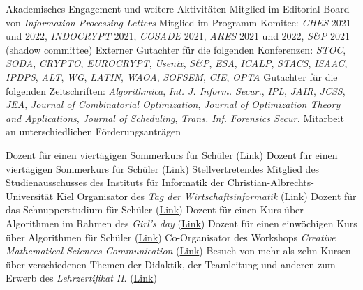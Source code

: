 \begin{rubric}{Akademisches Engagement und weitere Aktivitäten}
\entry* Mitglied im Editorial Board von \emph{Information Processing Letters}
\entry* Mitglied im Programm-Komitee: \emph{CHES} 2021 und 2022,
\emph{INDOCRYPT} 2021, \emph{COSADE}
2021, \emph{ARES} 2021 und 2022, \emph{S\&P} 2021 (shadow committee)
\entry* Externer Gutachter für die folgenden Konferenzen: \emph{STOC},
\emph{SODA}, \emph{CRYPTO}, \emph{EUROCRYPT}, \emph{Usenix}, \emph{S\&P}, \emph{ESA}, \emph{ICALP}, \emph{STACS}, \emph{ISAAC}, \emph{IPDPS}, \emph{ALT}, \emph{WG},
\emph{LATIN}, \emph{WAOA},
 \emph{SOFSEM}, \emph{CIE}, \emph{OPTA}
 \entry*  Gutachter für die folgenden Zeitschriften: \emph{Algorithmica}, \emph{Int. J. Inform. Secur.}, \emph{IPL},
\emph{JAIR}, \emph{JCSS},
\emph{JEA}, \emph{Journal of Combinatorial Optimization}, \emph{Journal of Optimization Theory and Applications},
\emph{Journal of Scheduling}, \emph{Trans. Inf. Forensics Secur.}
\entry* Mitarbeit an unterschiedlichen Förderungsanträgen 

\entry*[2021] Dozent für einen viertägigen Sommerkurs für Schüler
(\href{https://www.matz.uni-luebeck.de/index.php?id=34}{Link})
\entry*[2020] Dozent für einen viertägigen Sommerkurs für Schüler
(\href{https://www.lias.uni-luebeck.de/162/isc/isc2020.html}{Link})
\entry*[2019] Stellvertretendes Mitglied des Studienausschusses des Instituts für Informatik der Christian-Albrechts-Universität Kiel
\entry*[2018] Organisator des \emph{Tag der Wirtschaftsinformatik}
(\href{http://www.kn-online.de/Kiel/Tag-der-Wirtschaftsinformatik-Ein-extrem-wichtiges-Studium-in-Kiel}{Link})
\entry*[2018] Dozent für das Schnupperstudium für Schüler
(\href{https://www.inf.uni-kiel.de/de/informatik-schule/schnupperstudium/bilder-schnupperstudium/programm-2018}{Link})
\entry*[2017] Dozent für einen Kurs über Algorithmen im Rahmen des \emph{Girl's day}
(\href{https://www.inf.uni-kiel.de/de/aktuelles/girls-day-am-insitut-fuer-informatik}{Link})
\entry*[2016] Dozent für einen einwöchigen Kurs über Algorithmen für Schüler
(\href{https://www.lias.uni-luebeck.de/veranstaltungen/isc/isc16.html}{Link})
\entry*[2016] Co-Organisator des Workshops \emph{Creative Mathematical Sciences
  Communication} (\href{http://www.tcs.uni-luebeck.de/cmsc/}{Link})
\entry*[2012 -- 2015] Besuch von mehr als zehn Kursen über verschiedenen Themen der Didaktik, der Teamleitung und anderen zum Erwerb des \emph{Lehrzertifikat II}. 
 (\href{https://www.uni-luebeck.de/universitaet/personalangelegenheiten/interne-weiterbildung/zertifikate/hd-zertifikate.html}{Link})\\
\end{rubric}